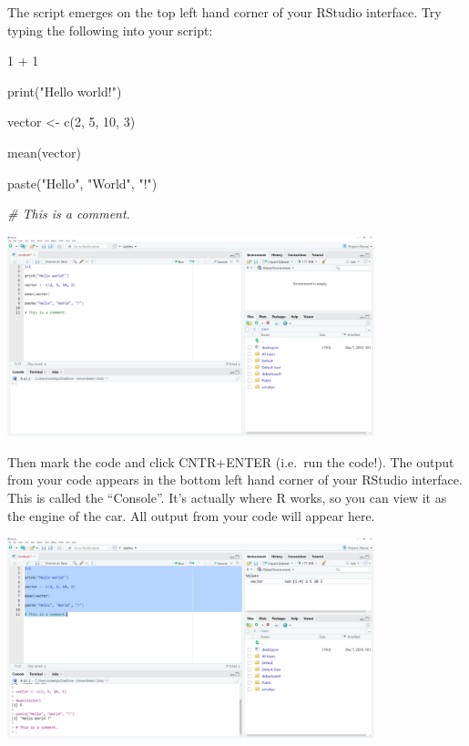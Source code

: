 \documentclass[
]{article}
\newenvironment{Shaded}{\begin{snugshade}}{\end{snugshade}}
\newcommand{\CommentTok}[1]{\textcolor[rgb]{0.56,0.35,0.01}{\textit{#1}}}
\newcommand{\DecValTok}[1]{\textcolor[rgb]{0.00,0.00,0.81}{#1}}
\newcommand{\FunctionTok}[1]{\textcolor[rgb]{0.00,0.00,0.00}{#1}}
\newcommand{\NormalTok}[1]{#1}
\newcommand{\OtherTok}[1]{\textcolor[rgb]{0.56,0.35,0.01}{#1}}
\newcommand{\SpecialCharTok}[1]{\textcolor[rgb]{0.00,0.00,0.00}{#1}}
\newcommand{\StringTok}[1]{\textcolor[rgb]{0.31,0.60,0.02}{#1}}
\begin{document}
The script emerges on the top left hand corner of your RStudio
interface. Try typing the following into your script:

\begin{Shaded}
\begin{Highlighting}[]
\DecValTok{1} \SpecialCharTok{+} \DecValTok{1}

\FunctionTok{print}\NormalTok{(}\StringTok{"Hello world!"}\NormalTok{)}

\NormalTok{vector }\OtherTok{\textless{}{-}} \FunctionTok{c}\NormalTok{(}\DecValTok{2}\NormalTok{, }\DecValTok{5}\NormalTok{, }\DecValTok{10}\NormalTok{, }\DecValTok{3}\NormalTok{)}

\FunctionTok{mean}\NormalTok{(vector)}

\FunctionTok{paste}\NormalTok{(}\StringTok{"Hello"}\NormalTok{, }\StringTok{"World"}\NormalTok{, }\StringTok{"!"}\NormalTok{)}

\CommentTok{\# This is a comment.}
\end{Highlighting}
\end{Shaded}

\includegraphics[width=0.8\textwidth,height=\textheight]{./figures/rstudio_3.png}

Then mark the code and click CNTR+ENTER (i.e.~run the code!). The output
from your code appears in the bottom left hand corner of your RStudio
interface. This is called the ``Console''. It's actually where R works,
so you can view it as the engine of the car. All output from your code
will appear here.

\includegraphics[width=0.8\textwidth,height=\textheight]{./figures/rstudio_4.png}
\end{document}
